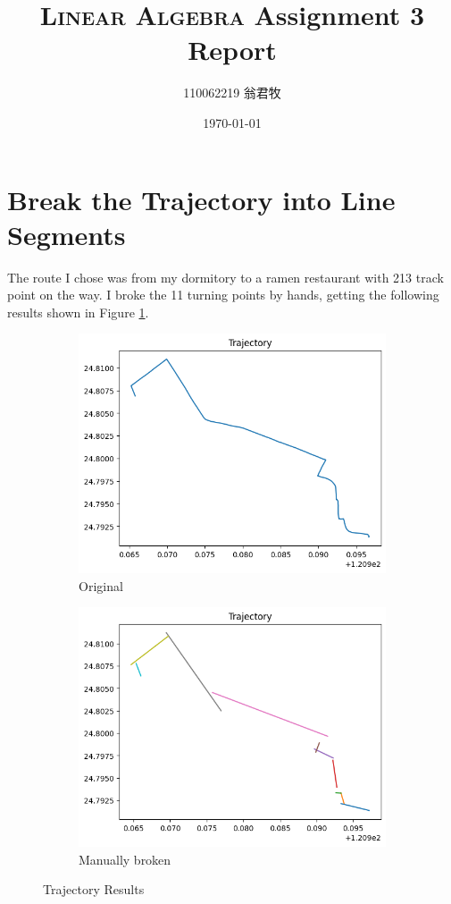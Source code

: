 \documentclass[12pt, a4paper]{article}
\title{\textsc{Linear Algebra} Assignment 3 Report}
\author{110062219 翁君牧}
\date{\today}
\begin{document}
\maketitle

\tableofcontents

\section{Break the Trajectory into Line Segments}

The route I chose was from my dormitory to a ramen restaurant with 213 track point on the way. I broke the 11 turning points by hands, getting the following results shown in Figure \ref{fig:q1}.

\begin{figure}[htbp]
\centering
\begin{subfigure}{.475\linewidth}
\includegraphics[width=\linewidth]{q1}
\caption{Original}
\end{subfigure}
\begin{subfigure}{.475\linewidth}
\includegraphics[width=\linewidth]{q1_p}
\caption{Manually broken}
\end{subfigure}
\caption{Trajectory Results}
\label{fig:q1}
\end{figure}
\end{document}
